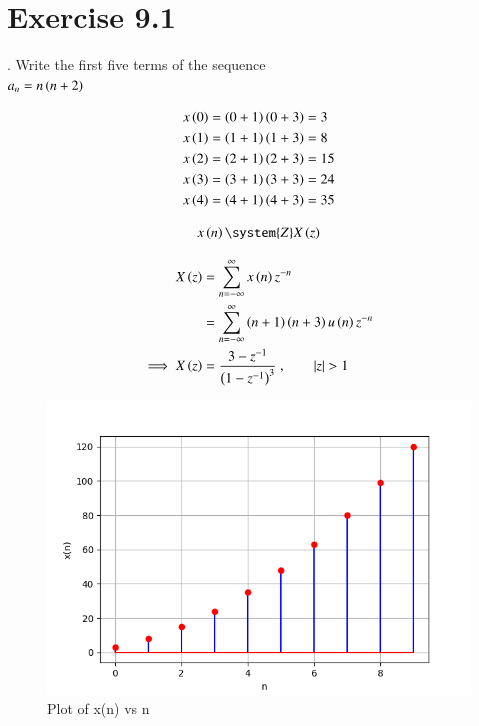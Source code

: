 \documentclass[journal,12pt,twocolumn]{IEEEtran}
\begin{document}


\vspace{3cm}

\title{}
\author{EE23BTECH11024 - G.Karthik Yadav$^{*}$
}
\maketitle
\newpage
\bigskip



\section*{Exercise 9.1}

. \hspace{2pt}Write the first five terms of the sequence\\
$a_n = n \left(n+2\right)$

\solution



\begin{align}
	x \left(0\right) & = \left(0+1\right)\left(0+3\right) = 3 \\
x \left(1\right) & = \left(1+1\right)\left(1+3\right) = 8\\
x \left(2\right) & = \left(2+1\right)\left(2+3\right) = 15\\
x \left(3\right) & = \left(3+1\right)\left(3+3\right) = 24\\
x \left(4\right) & = \left(4+1\right)\left(4+3\right) = 35
\end{align} 

\begin{align}
	x \brak{n} \system{Z} X \brak{z} 
\end{align}

\begin{align}
    X \left(z\right) & = \sum_{n=-\infty}^{\infty} x \left(n\right)   z^{-n} \\
    & = \sum_{n=-\infty}^{\infty}  \left(n+1\right)\left(n+3\right) u \left(n\right)   z^{-n} \\
    \implies X \left(z\right) & = \frac{ 3-z^{-1}}{\left(1-z^{-1}\right)^3} \text{ ,}\qquad \left\vert z\right\vert>1
\end{align}

\begin{figure}[ht]
   \centering
   \includegraphics[width=1\columnwidth]{figs/plot1.png}
   \caption{Plot of x(n) vs n}
   \label{fig: 1.11.9.1.1}
\end{figure}
\end{document}
